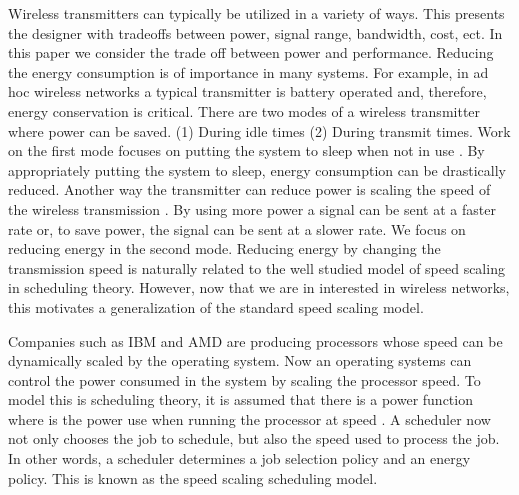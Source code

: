 \documentclass[11pt]{article}
\begin{document}
Wireless transmitters can typically be utilized in a variety of ways.  This  presents the designer with tradeoffs between power, signal range, bandwidth, cost, ect.  In this paper we consider the trade off between power and performance.  Reducing the energy consumption is of importance in many systems.  For example, in ad hoc wireless networks a typical transmitter is battery operated and, therefore, energy conservation is critical.  There are two modes of a wireless transmitter where power can be saved. (1) During idle times (2) During transmit times. Work on the first mode focuses on  putting the system to sleep when not in use \cite{Chen01,Ad00}.  By appropriately putting the system to sleep, energy consumption can be drastically reduced.   Another way the transmitter can reduce power is scaling the speed of the wireless transmission  \cite{IraniSG07}. By using more power a signal can be sent at a faster rate or, to save power, the signal can be sent at a slower rate.    We focus on reducing energy in the second mode. Reducing energy by changing the transmission speed is naturally related to the well studied model of speed scaling in scheduling theory.  However, now that we are in interested in wireless networks, this motivates a generalization of the standard speed scaling model.
 
Companies such as IBM and AMD are producing processors whose speed can be dynamically scaled by the operating system.  Now an operating systems can control the power consumed in the system by scaling the processor speed.  To model this is scheduling theory, it is assumed that there is a power function  where  is the power use when running the processor at speed .  A scheduler now not only chooses the job to schedule, but also the speed used to process the job.  In other words, a scheduler determines a job selection policy and an energy policy.  This is known as the speed scaling scheduling model.  
\end{document}
